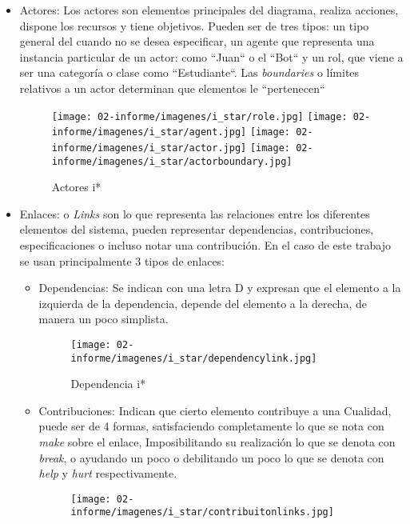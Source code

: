 \begin{itemize}
        \item Actores: Los actores son elementos principales del diagrama, realiza acciones, dispone los recursos y tiene objetivos. Pueden ser de tres tipos: un tipo general del cuando no se desea especificar, un agente que representa una instancia particular de un actor: como ``Juan`` o el ``Bot`` y un rol, que viene a ser una categoría o clase como ``Estudiante``. Las \textit{boundaries} o límites relativos a un actor determinan que elementos le ``pertenecen``
        \begin{figure}[h!]
            \centering
            \texttt{[image: 02-informe/imagenes/i\_star/role.jpg]}
            \texttt{[image: 02-informe/imagenes/i\_star/agent.jpg]}
            \texttt{[image: 02-informe/imagenes/i\_star/actor.jpg]}
            \texttt{[image: 02-informe/imagenes/i\_star/actorboundary.jpg]}
            \caption{Actores \gls{i*}}
            \label{fig:my_label}
        \end{figure}
        \item Enlaces: o \textit{Links} son lo que representa las relaciones entre los diferentes elementos del sistema, pueden representar dependencias, contribuciones, especificaciones o incluso notar una contribución. En el caso de este trabajo se usan principalmente 3 tipos de enlaces:
        \begin{itemize}
            \item Dependencias: Se indican con una letra D y expresan que el elemento a la izquierda de la dependencia, depende del elemento a la derecha, de manera un poco simplista.
            \begin{figure}[h!]
                \centering
                \texttt{[image: 02-informe/imagenes/i\_star/dependencylink.jpg]}
                \caption{Dependencia \gls{i*}}
                \label{fig:my_label}
            \end{figure}
            \item Contribuciones: Indican que cierto elemento contribuye a una Cualidad, puede ser de 4 formas, satisfaciendo completamente lo que se nota con \textit{make} sobre el enlace, Imposibilitando su realización lo que se denota con \textit{break}, o ayudando un poco o debilitando un poco lo que se denota con \textit{help} y \textit{hurt} respectivamente.
            \begin{figure}[h!]
                \centering
                \texttt{[image: 02-informe/imagenes/i\_star/contribuitonlinks.jpg]}

\end{figure}
\end{itemize}
\end{itemize}
